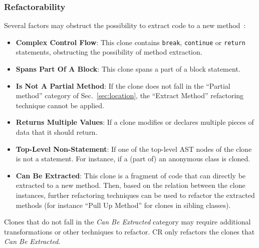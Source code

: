 \documentclass[sigconf,review,anonymous]{acmart}
\begin{document}
\subsubsection{Refactorability} \label{sec:refactorability}
Several factors may obstruct the possibility to extract code to a new method~\cite{tsantalis2015assessing}:
\begin{itemize}
    \item \textbf{Complex Control Flow}: This clone contains \texttt{break}, \texttt{continue} or \texttt{return} statements, obstructing the possibility of method extraction.
    \item \textbf{Spans Part Of A Block}: This clone spans a part of a block statement.
    \item \textbf{Is Not A Partial Method}: If the clone does not fall in the ``Partial method'' category of Sec.~\ref{sec:location}, the ``Extract Method'' refactoring technique cannot be applied.
    \item \textbf{Returns Multiple Values}: If a clone modifies or declares multiple pieces of data that it should return.
    \item \textbf{Top-Level Non-Statement}: If one of the top-level AST nodes of the clone is not a statement. For instance, if a (part of) an anonymous class is cloned.
    \item \textbf{Can Be Extracted}: This clone is a fragment of code that can directly be extracted to a new method. Then, based on the relation between the clone instances, further refactoring techniques can be used to refactor the extracted methods (for instance ``Pull Up Method'' for clones in sibling classes).
\end{itemize}
Clones that do not fall in the \textit{Can Be Extracted} category may require additional transformations or other techniques to refactor. CR only refactors the clones that \textit{Can Be Extracted}.
\end{document}

